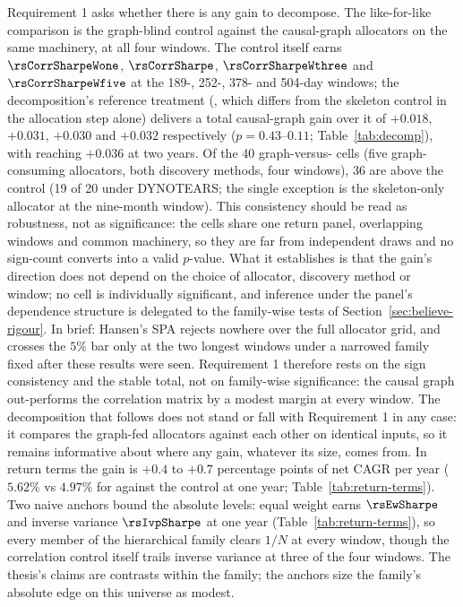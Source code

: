 Requirement 1 asks whether there is any gain to decompose. The like-for-like
comparison is the graph-blind \HRP{} control against the causal-graph
allocators on the same machinery, at all four windows. The control itself
earns $\rsCorrSharpeWone$, $\rsCorrSharpe$, $\rsCorrSharpeWthree$ and
$\rsCorrSharpeWfive$ at the 189-, 252-, 378- and 504-day windows; the
decomposition's reference treatment (\skelsem{}, which differs from the
skeleton control in the allocation step alone) delivers a total
causal-graph gain over it of $+0.018$,
$+0.031$, $+0.030$ and $+0.032$ respectively ($p=0.43$--$0.11$;
Table~\ref{tab:decomp}), with \orientsem{} reaching $+0.036$ at two
years. Of the 40
graph-versus-\HRP{} cells (five graph-consuming allocators, both
discovery methods, four windows), 36 are above the control (19 of 20 under
DYNOTEARS; the single exception is the skeleton-only allocator at the
nine-month window). This consistency should be read as robustness, not as
significance: the cells share one return panel, overlapping windows and
common machinery, so they are far from independent draws and no sign-count
converts into a valid $p$-value. What it establishes is that the gain's
direction does not depend on the choice of allocator, discovery method or
window; no cell is individually significant, and inference under the
panel's dependence structure is delegated to the family-wise tests of
Section~\ref{sec:believe-rigour}. In brief: Hansen's SPA rejects
nowhere over the full allocator grid, and crosses the $5\%$ bar only at
the two longest windows under a narrowed family fixed after these
results were seen. Requirement 1 therefore rests on the sign
consistency and the stable total, not on family-wise significance: the
causal graph out-performs the correlation matrix by a modest margin at
every window. The decomposition that follows
does not stand or fall with Requirement 1 in any case: it compares the
graph-fed allocators against each other on identical inputs, so it
remains informative about where any gain, whatever its size, comes
from. In return
terms the gain is $+0.4$ to $+0.7$ percentage points of net CAGR per year
($5.62\%$ vs $4.97\%$ for \skelsem{} against the control at one year;
Table~\ref{tab:return-terms}). Two naive anchors bound the absolute
levels: equal weight earns $\rsEwSharpe$ and inverse variance
$\rsIvpSharpe$ at one year (Table~\ref{tab:return-terms}), so every
member of the hierarchical family clears $1/N$ at every window, though
the correlation control itself trails inverse variance at three of the
four windows. The
thesis's claims are contrasts within the family; the anchors size the
family's absolute edge on this universe as modest.

